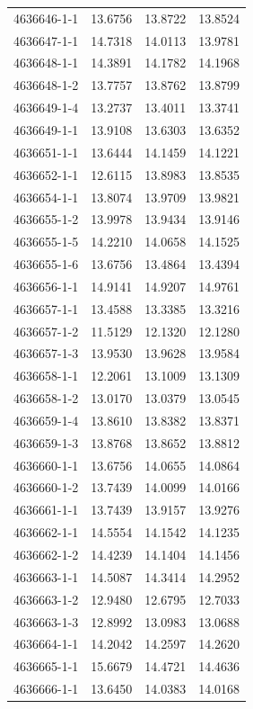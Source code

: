 \begin{longtable}{lrrr}
4636646-1-1 & 13.6756 & 13.8722 & 13.8524 \\
4636647-1-1 & 14.7318 & 14.0113 & 13.9781 \\
4636648-1-1 & 14.3891 & 14.1782 & 14.1968 \\
4636648-1-2 & 13.7757 & 13.8762 & 13.8799 \\
4636649-1-4 & 13.2737 & 13.4011 & 13.3741 \\
4636649-1-1 & 13.9108 & 13.6303 & 13.6352 \\
4636651-1-1 & 13.6444 & 14.1459 & 14.1221 \\
4636652-1-1 & 12.6115 & 13.8983 & 13.8535 \\
4636654-1-1 & 13.8074 & 13.9709 & 13.9821 \\
4636655-1-2 & 13.9978 & 13.9434 & 13.9146 \\
4636655-1-5 & 14.2210 & 14.0658 & 14.1525 \\
4636655-1-6 & 13.6756 & 13.4864 & 13.4394 \\
4636656-1-1 & 14.9141 & 14.9207 & 14.9761 \\
4636657-1-1 & 13.4588 & 13.3385 & 13.3216 \\
4636657-1-2 & 11.5129 & 12.1320 & 12.1280 \\
4636657-1-3 & 13.9530 & 13.9628 & 13.9584 \\
4636658-1-1 & 12.2061 & 13.1009 & 13.1309 \\
4636658-1-2 & 13.0170 & 13.0379 & 13.0545 \\
4636659-1-4 & 13.8610 & 13.8382 & 13.8371 \\
4636659-1-3 & 13.8768 & 13.8652 & 13.8812 \\
4636660-1-1 & 13.6756 & 14.0655 & 14.0864 \\
4636660-1-2 & 13.7439 & 14.0099 & 14.0166 \\
4636661-1-1 & 13.7439 & 13.9157 & 13.9276 \\
4636662-1-1 & 14.5554 & 14.1542 & 14.1235 \\
4636662-1-2 & 14.4239 & 14.1404 & 14.1456 \\
4636663-1-1 & 14.5087 & 14.3414 & 14.2952 \\
4636663-1-2 & 12.9480 & 12.6795 & 12.7033 \\
4636663-1-3 & 12.8992 & 13.0983 & 13.0688 \\
4636664-1-1 & 14.2042 & 14.2597 & 14.2620 \\
4636665-1-1 & 15.6679 & 14.4721 & 14.4636 \\
4636666-1-1 & 13.6450 & 14.0383 & 14.0168 \\

\end{longtable}
